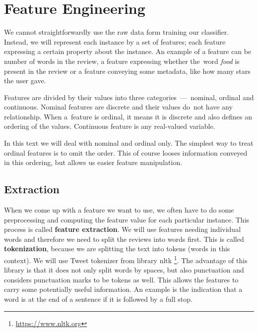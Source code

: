 \chapter{Feature Engineering}
\label{chap:fea}



We cannot straightforwardly use the raw data form training our classifier.
Instead, we will represent each instance by a set of features;
each feature expressing a certain property about the instance.
An example of a feature can be number of words in the review,
a feature expressing whether the~word {\it food} is present in the review
or a feature conveying some metadata, like how many stars the user gave.

Features are divided by their values into three categories~---~nominal, ordinal and continuous.
Nominal features are discrete and their values do~not have any relationship.
When a~feature is ordinal, it means it is discrete and also defines an ordering of the values.
Continuous feature is any real-valued variable.

In this text we will deal with nominal and ordinal only.
The simplest way to treat ordinal features is to omit the order.
This of course looses information conveyed in this ordering,
but allows us easier feature manipulation.

\section{Extraction}

When we come up with a feature we want to use,
we often have to do some preprocessing and computing the feature value for each particular instance.
This process is called {\bf feature extraction}.
We will use features needing individual words 
and therefore we need to split the reviews into words first.
This is called {\bf tokenization}, because we are splitting the text into tokens (words in this context).
We will use Tweet tokenizer from library nltk \footnote{\url{https://www.nltk.org}}.
The advantage of this library is that it does not only split words by spaces,
but also punctuation and considers punctuation marks to be tokens as well.
This allows the features to carry some potentially useful information.
An example is the indication that a word is at the end of a sentence if it is followed by a full stop.

